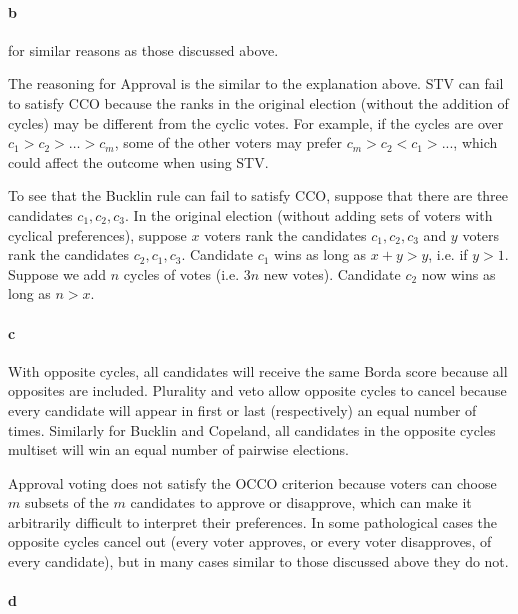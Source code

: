 \begin{answer}{1}
\paragraph{b}  for similar reasons as those discussed above. 

 The reasoning for Approval is the similar to the explanation above. STV can fail to satisfy CCO because the ranks in the original election (without the addition of cycles) may be different from the cyclic votes. For example, if the cycles are over $c_1>c_2> \ldots > c_m$, some of the other voters may prefer $c_m>c_2<c_1>...$, which could affect the outcome when using STV.

To see that the Bucklin rule can fail to satisfy CCO, suppose that there are three candidates $c_1,c_2,c_3$. In the original election (without adding sets of voters with cyclical preferences), suppose $x$ voters rank the candidates $c_1,c_2,c_3$ and $y$ voters rank the candidates $c_2,c_1,c_3$. Candidate $c_1$ wins as long as $x+y>y$, i.e. if $y>1$. Suppose we add $n$ cycles of votes (i.e. $3n$ new votes). Candidate $c_2$ now wins as long as $n>x$.


\paragraph{c}  

With opposite cycles, all candidates will receive the same Borda score because all opposites are included. Plurality and veto allow opposite cycles to cancel because every candidate will appear in first or last (respectively) an equal number of times. Similarly for Bucklin and Copeland, all candidates in the opposite cycles multiset will win an equal number of pairwise elections.

Approval voting does not satisfy the OCCO criterion because voters can choose $m$ subsets of the $m$ candidates to approve or disapprove, which can make it arbitrarily difficult to interpret their preferences. In some pathological cases the opposite cycles cancel out (every voter approves, or every voter disapproves, of every candidate), but in many cases similar to those discussed above they do not.


\paragraph{d}  

\end{answer}

